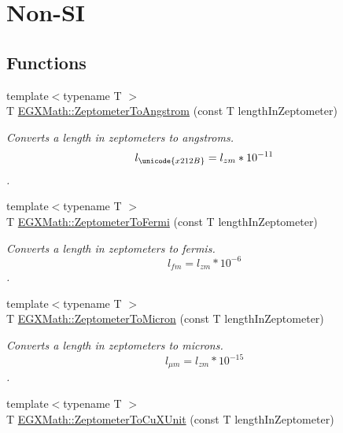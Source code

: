 \hypertarget{group___e_g_x_math-_conversions-_length_conversions-_s_i-_zeptometer-_non-_s_i}{}\section{Non-\/\+SI}
\label{group___e_g_x_math-_conversions-_length_conversions-_s_i-_zeptometer-_non-_s_i}
\subsection*{Functions}
\begin{DoxyCompactItemize}
\item 
{\footnotesize template$<$typename T $>$ }\\T \mbox{\hyperlink{group___e_g_x_math-_conversions-_length_conversions-_s_i-_zeptometer-_non-_s_i_gaa7023afd2a269dddf741cb4299803ef2}{E\+G\+X\+Math\+::\+Zeptometer\+To\+Angstrom}} (const T length\+In\+Zeptometer)
\begin{DoxyCompactList}\small\item\em Converts a length in zeptometers to angstroms. \[ l_{\unicode{x212B}}=l_{zm} * 10^{-11} \]. \end{DoxyCompactList}\item 
{\footnotesize template$<$typename T $>$ }\\T \mbox{\hyperlink{group___e_g_x_math-_conversions-_length_conversions-_s_i-_zeptometer-_non-_s_i_ga15c5cde158a9916cc01d998c7abc38c4}{E\+G\+X\+Math\+::\+Zeptometer\+To\+Fermi}} (const T length\+In\+Zeptometer)
\begin{DoxyCompactList}\small\item\em Converts a length in zeptometers to fermis. \[ l_{fm}=l_{zm} * 10^{-6} \]. \end{DoxyCompactList}\item 
{\footnotesize template$<$typename T $>$ }\\T \mbox{\hyperlink{group___e_g_x_math-_conversions-_length_conversions-_s_i-_zeptometer-_non-_s_i_ga0bd42e8489b135f27530a247193286da}{E\+G\+X\+Math\+::\+Zeptometer\+To\+Micron}} (const T length\+In\+Zeptometer)
\begin{DoxyCompactList}\small\item\em Converts a length in zeptometers to microns. \[ l_{\mu m}=l_{zm} * 10^{-15} \]. \end{DoxyCompactList}\item 
{\footnotesize template$<$typename T $>$ }\\T \mbox{\hyperlink{group___e_g_x_math-_conversions-_length_conversions-_s_i-_zeptometer-_non-_s_i_gaeeff3d1ea7d8cd0c703419ce16fcadd7}{E\+G\+X\+Math\+::\+Zeptometer\+To\+Cu\+X\+Unit}} (const T length\+In\+Zeptometer)

\end{DoxyCompactItemize}
